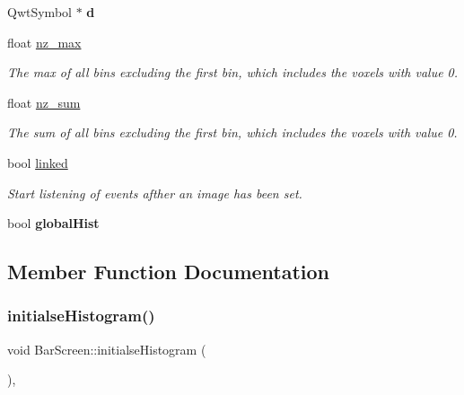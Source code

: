 \begin{DoxyCompactItemize}
\mbox{\label{classBarScreen_a2be28f5fb73a79676c840fa62a482c63}} 
Qwt\+Symbol $\ast$ {\bfseries d}
\item 
\mbox{\label{classBarScreen_a93ef91eff5bcac1a17ccb7b5a4811368}} 
float \mbox{\hyperlink{classBarScreen_a93ef91eff5bcac1a17ccb7b5a4811368}{nz\+\_\+max}}
\begin{DoxyCompactList}\small\item\em The max of all bins excluding the first bin, which includes the voxels with value 0. \end{DoxyCompactList}\item 
\mbox{\label{classBarScreen_adf2fa1b3686c92bd20e8c0befc06caf7}} 
float \mbox{\hyperlink{classBarScreen_adf2fa1b3686c92bd20e8c0befc06caf7}{nz\+\_\+sum}}
\begin{DoxyCompactList}\small\item\em The sum of all bins excluding the first bin, which includes the voxels with value 0. \end{DoxyCompactList}\item 
\mbox{\label{classBarScreen_a2222951d5a5ce44bb22da49e62e8f797}} 
bool \mbox{\hyperlink{classBarScreen_a2222951d5a5ce44bb22da49e62e8f797}{linked}}
\begin{DoxyCompactList}\small\item\em Start listening of events afther an image has been set. \end{DoxyCompactList}\item 
\mbox{\label{classBarScreen_a3c0cbb54bb95017b259687ee79232a08}} 
bool {\bfseries global\+Hist}
\end{DoxyCompactItemize}


\subsection{Member Function Documentation}
\mbox{\label{classBarScreen_ae652343345f7cc3f7726569c1195ee9a}} 
\subsubsection{\texorpdfstring{initialse\+Histogram()}{initialseHistogram()}}
{\footnotesize\ttfamily void Bar\+Screen\+::initialse\+Histogram (\begin{DoxyParamCaption}{ }\end{DoxyParamCaption})\hspace{0.3cm}{\ttfamily [protected]}, {\ttfamily [inherited]}}

